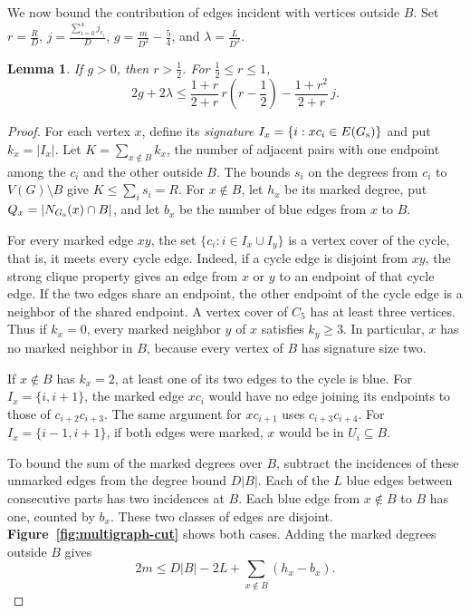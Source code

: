 \documentclass[preprint,11pt,numbers]{elsarticle-arxiv}
\numberwithin{equation}{section}
\newtheorem{lemma}[theorem]{Lemma}
\theoremstyle{definition}
\begin{document}
We now bound the contribution of edges incident with vertices outside $B$.
Set $r=\frac{R}{D}$, $j=\frac{\sum_{i=0}^4j_{c_i}}{D}$,
$g=\frac{m}{D^2}-\frac{5}{4}$, and $\lambda=\frac{L}{D^2}$.

\begin{lemma}\label{lem:multigraph-cycle-counts}
If $g>0$, then $r>\frac{1}{2}$. For $\frac{1}{2}\le r\le1$,
\begin{equation}\label{eq:multi-joint}
 2g+2\lambda\le
 \frac{1+r}{2+r}\,r\left(r-\frac{1}{2}\right)
 -\frac{1+r^2}{2+r}\,j.
\end{equation}
\end{lemma}
\begin{proof}
For each vertex $x$, define its \emph{signature}
$I_x=\{i:xc_i\in E(G_{\rm s})\}$ and put $k_x=|I_x|$. Let
$K=\sum_{x\notin B}k_x$, the number of adjacent pairs with one
endpoint among the $c_i$ and the other outside $B$. The bounds
$s_i$ on the degrees from $c_i$ to $V(G)\setminus B$ give
$K\leq\sum_i s_i=R$. For $x\notin B$, let $h_x$ be its marked
degree, put $Q_x=|N_{G_{\rm s}}(x)\cap B|$, and let $b_x$ be the
number of blue edges from $x$ to $B$.

For every marked edge $xy$, the set $\{c_i:i\in I_x\cup I_y\}$ is
a vertex cover of the cycle, that is, it meets every cycle edge.
Indeed, if a cycle edge is disjoint from $xy$, the strong clique
property gives an edge from $x$ or $y$ to an endpoint of that cycle
edge. If the two edges share an endpoint, the other endpoint of the
cycle edge is a neighbor of the shared endpoint. A vertex cover of
$C_5$ has at least three vertices. Thus if $k_x=0$, every marked
neighbor $y$ of $x$ satisfies $k_y\geq3$. In particular, $x$ has no
marked neighbor in $B$, because every vertex of $B$ has signature
size two.

If $x\notin B$ has $k_x=2$, at least one of its two edges to the
cycle is blue. For $I_x=\{i,i+1\}$, the marked edge $xc_i$ would
have no edge joining its endpoints to those of $c_{i+2}c_{i+3}$.
The same argument for $xc_{i+1}$ uses $c_{i+3}c_{i+4}$. For
$I_x=\{i-1,i+1\}$, if both edges were marked, $x$ would be in
$U_i\subseteq B$.

To bound the sum of the marked degrees over $B$, subtract the
incidences of these unmarked edges from the degree bound $D|B|$.
Each of the $L$ blue edges between consecutive parts has two
incidences at $B$. Each blue edge from $x\notin B$ to $B$ has
one, counted by $b_x$. These two classes of edges are disjoint.
\textbf{Figure~\ref{fig:multigraph-cut}} shows both cases.
Adding the marked degrees outside $B$ gives
\begin{equation}\label{eq:multi-core-cut}
 2m\le D|B|-2L+\sum_{x\notin B}(h_x-b_x).
\end{equation}


\end{proof}
\end{document}
